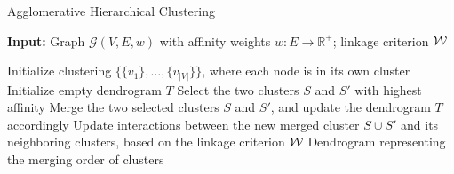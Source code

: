 \begin{algorithm}[t]
\footnotesize
  \begin{flushleft}
  \footnotesize
  \caption{Agglomerative Hierarchical Clustering}
   \hspace*{\algorithmicindent} \textbf{Input:} Graph $\mathcal{G}(V,E,w)$ with affinity weights $w:E \rightarrow \mathbb{R}^+$; linkage criterion $\mathcal{W}{}$ \\
  \begin{algorithmic}[1]
  \footnotesize
      \State Initialize clustering $\{\{v_1\}, \ldots, \{v_{|V|}\}\}$, where each node is in its own cluster
      \State Initialize empty dendrogram $T$
      \Repeat 
        \State Select the two clusters $S$ and $S'$ with highest affinity
        \State Merge the two selected clusters $S$ and $S'$, and update the dendrogram $T$ accordingly
        \State Update interactions between the new merged cluster $S \cup S'$ and its neighboring clusters, based on the linkage criterion $\mathcal{W}{}$
      \State
      \Return Dendrogram representing the merging order of clusters
  \end{algorithmic}
    \label{HC_algoritm}
  \end{flushleft}

\end{algorithm}


